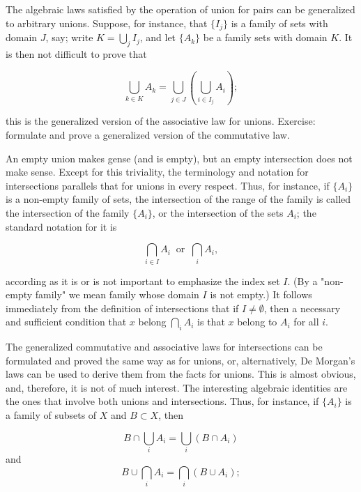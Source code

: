 The algebraic laws satisfied by the operation of union for pairs can be generalized to arbitrary unions. Suppose, for instance, that $ \{ I_{j} \}$ is a family of sets with domain $J$, say; write $K = \bigcup_{j}I_{j}$, and let $\{ A_{k} \}$ be a family sets with domain $K$. It is then not difficult to prove that 

\begin{equation*}
\bigcup_{k \in K}A_{k} = \bigcup_{j \in J}(\bigcup_{i \in I_{j}}A_{i});
\end{equation*}

this is the generalized version of the associative law for unions. Exercise: formulate and prove a generalized version of the commutative law. 

An empty union makes gense (and is empty), but an empty intersection does not make sense. Except for this triviality, the terminology and notation for intersections parallels that for unions in every respect. Thus, for instance, if $\{ A_{i} \}$ is a non-empty family of sets, the intersection of the range of the family is called the intersection of the family $\{ A_{i} \}$, or the intersection of the sets $A_{i}$; the standard notation for it is 

\begin{equation*}
\bigcap_{i \in I}A_{i} \: \text{ or } \: \bigcap_{i}A_{i},
\end{equation*}

according as it is or is not important to emphasize the index set $I$. (By a "non-empty family" we mean family whose domain $I$ is not empty.) It follows immediately from the definition of intersections that if $I \neq \emptyset$, then a necessary and sufficient condition that $x$ belong $\bigcap_{i}A_{i}$ is that $x$ belong to $A_{i}$ for all $i$. 

The generalized commutative and associative laws for intersections can be formulated and proved the same way as for unions, or, alternatively, De Morgan's laws can be used to derive them from the facts for unions. This is almost obvious, and, therefore, it is not of much interest. The interesting algebraic identities are the ones that involve both unions and intersections. Thus, for instance, if $\{ A_{i} \}$ is a family of subsets of $X$ and $B \subset X$, then 

\begin{equation*}
B \cap \bigcup_{i}A_{i} = \bigcup_{i}(B \cap A_{i})
\end{equation*}
and
\begin{equation*}
B \cup \bigcap_{i}A_{i} = \bigcap_{i}(B \cup A_{i});
\end{equation*}

